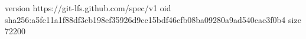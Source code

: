 version https://git-lfs.github.com/spec/v1
oid sha256:a5fc11a1f88df3cb198ef35926d9cc15bdf46cfb08ba09280a9ad540cac3f0b4
size 72200
